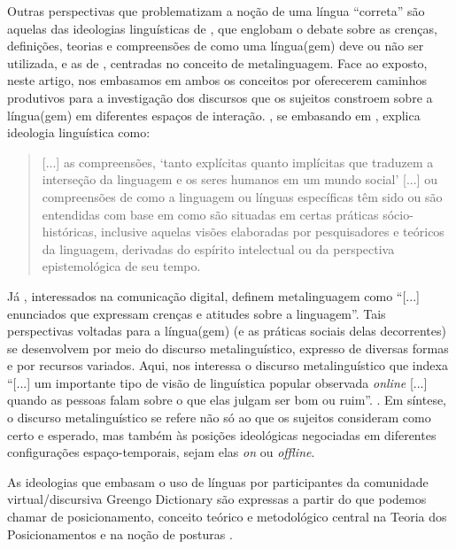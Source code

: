 \documentclass[portuguese]{textolivre}
\begin{document}
Outras perspectivas que problematizam a noção de uma língua “correta” são aquelas das ideologias linguísticas de \textcite{moita_lopes_ingles_2008,moita_lopes_ideologia_2013}, que englobam o debate sobre as crenças, definições, teorias e compreensões de como uma língua(gem) deve ou não ser utilizada, e as de \textcite{barton_linguagem_2015}, centradas no conceito de metalinguagem. Face ao exposto, neste artigo, nos embasamos em ambos os conceitos por oferecerem caminhos produtivos para a investigação dos discursos que os sujeitos constroem sobre a língua(gem) em diferentes espaços de interação. 					
\textcite[p. 22]{moita_lopes_ideologia_2013}, se embasando em \textcite[p. 3]{woolard_introduction:_2008}, explica ideologia linguística como:

\begin{quote}
    [...] as compreensões, ‘tanto explícitas quanto implícitas que traduzem a interseção da linguagem e os seres humanos em um mundo social’ [...] ou compreensões de como a linguagem ou línguas específicas têm sido ou são entendidas com base em como são situadas em certas práticas sócio-históricas, inclusive aquelas visões elaboradas por pesquisadores e teóricos da linguagem, derivadas do espírito intelectual ou da perspectiva epistemológica de seu tempo.
\end{quote}

Já \textcite[p. 144]{barton_linguagem_2015}, interessados na comunicação digital, definem metalinguagem como “[...] enunciados que expressam crenças e atitudes sobre a linguagem”. Tais perspectivas voltadas para a língua(gem) (e as práticas sociais delas decorrentes) se desenvolvem por meio do discurso metalinguístico, expresso de diversas formas e por recursos variados. Aqui, nos interessa o discurso metalinguístico que indexa “[...] um importante tipo de visão de linguística popular observada \textit{online} [...] quando as pessoas falam sobre o que elas julgam ser bom ou ruim”. \cite[p. 147]{barton_linguagem_2015}. Em síntese, o discurso metalinguístico se refere não só ao que os sujeitos consideram como certo e esperado, mas também às posições ideológicas negociadas em diferentes configurações espaço-temporais, sejam elas \textit{on} ou \textit{offline}. 

As ideologias que embasam o uso de línguas por participantes da comunidade virtual/discursiva Greengo Dictionary são expressas a partir do que podemos chamar de posicionamento, conceito teórico e metodológico central na Teoria dos Posicionamentos \cite{harre_positioning_1999} e na noção de posturas \cite{barton_linguagem_2015}.										
\end{document}
